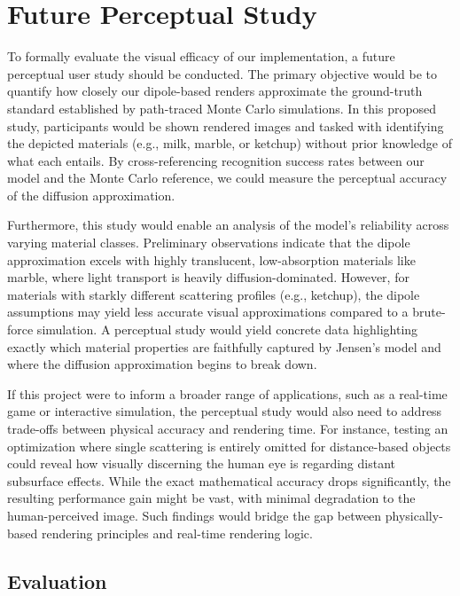 \documentclass[sigconf,nonacm]{acmart}
\begin{document}
\section{Future Perceptual Study}

To formally evaluate the visual efficacy of our implementation, a future perceptual user study should be conducted. The primary objective would be to quantify how closely our dipole-based renders approximate the ground-truth standard established by path-traced Monte Carlo simulations. In this proposed study, participants would be shown rendered images and tasked with identifying the depicted materials (e.g., milk, marble, or ketchup) without prior knowledge of what each entails. By cross-referencing recognition success rates between our model and the Monte Carlo reference, we could measure the perceptual accuracy of the diffusion approximation.

Furthermore, this study would enable an analysis of the model's reliability across varying material classes. Preliminary observations indicate that the dipole approximation excels with highly translucent, low-absorption materials like marble, where light transport is heavily diffusion-dominated. However, for materials with starkly different scattering profiles (e.g., ketchup), the dipole assumptions may yield less accurate visual approximations compared to a brute-force simulation. A perceptual study would yield concrete data highlighting exactly which material properties are faithfully captured by Jensen's model and where the diffusion approximation begins to break down.

If this project were to inform a broader range of applications, such as a real-time game or interactive simulation, the perceptual study would also need to address trade-offs between physical accuracy and rendering time. For instance, testing an optimization where single scattering is entirely omitted for distance-based objects could reveal how visually discerning the human eye is regarding distant subsurface effects. While the exact mathematical accuracy drops significantly, the resulting performance gain might be vast, with minimal degradation to the human-perceived image. Such findings would bridge the gap between physically-based rendering principles and real-time rendering logic.

\subsection{Evaluation}
\end{document}
